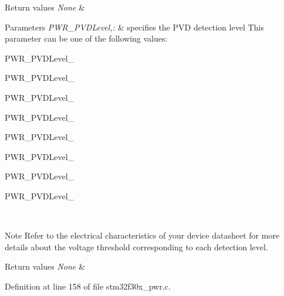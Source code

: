 \begin{DoxyRetVals}{Return values}
{\em None} & \\
\hline
\end{DoxyRetVals}

\begin{DoxyParams}{Parameters}
{\em P\-W\-R\-\_\-\-P\-V\-D\-Level,\-:} & specifies the P\-V\-D detection level This parameter can be one of the following values\-: \begin{DoxyItemize}
\item P\-W\-R\-\_\-\-P\-V\-D\-Level\-\_ \item P\-W\-R\-\_\-\-P\-V\-D\-Level\-\_ \item P\-W\-R\-\_\-\-P\-V\-D\-Level\-\_ \item P\-W\-R\-\_\-\-P\-V\-D\-Level\-\_ \item P\-W\-R\-\_\-\-P\-V\-D\-Level\-\_ \item P\-W\-R\-\_\-\-P\-V\-D\-Level\-\_ \item P\-W\-R\-\_\-\-P\-V\-D\-Level\-\_ \item P\-W\-R\-\_\-\-P\-V\-D\-Level\-\_ \end{DoxyItemize}
\\
\hline
\end{DoxyParams}
\begin{DoxyNote}{Note}
Refer to the electrical characteristics of your device datasheet for more details about the voltage threshold corresponding to each detection level. 
\end{DoxyNote}

\begin{DoxyRetVals}{Return values}
{\em None} & \\
\hline
\end{DoxyRetVals}


Definition at line 158 of file stm32f30x\-\_\-pwr.\-c.

